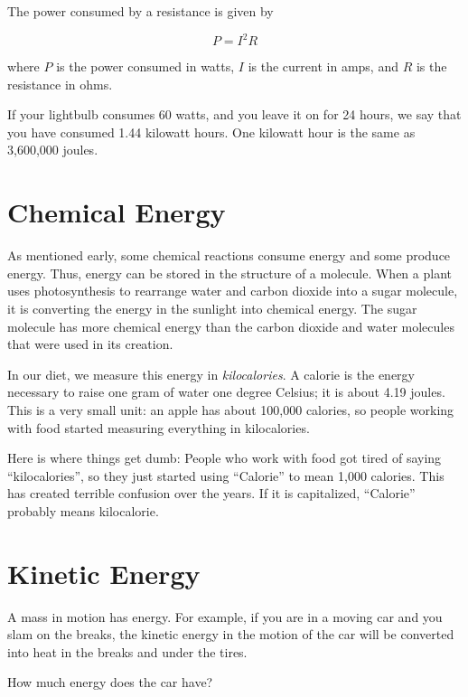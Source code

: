 \begin{mdframed}[style=important]
The power consumed by a resistance is given by

$$P = I^2R$$

where $P$ is the power consumed in watts, $I$ is the current in amps,
and $R$ is the resistance in ohms.

\end{mdframed}


If your lightbulb consumes 60 watts, and you leave it on for 24 hours,
we say that you have consumed 1.44 kilowatt hours. One kilowatt hour
is the same as 3,600,000 joules.

\section{Chemical Energy}

As mentioned early, some chemical reactions consume energy and some
produce energy. Thus, energy can be stored in the structure of a
molecule. When a plant uses photosynthesis to rearrange water and
carbon dioxide into a sugar molecule, it is converting the energy in
the sunlight into chemical energy. The sugar molecule has more
chemical energy than the carbon dioxide and water molecules that were
used in its creation.

In our diet, we measure this energy in \textit{kilocalories}. A
calorie is the energy necessary to raise one gram of water one degree
Celsius; it is about 4.19 joules. This is a very small unit: an apple
has about 100,000 calories, so people working with food started
measuring everything in kilocalories.

Here is where things get dumb: People who work with food got tired of
saying ``kilocalories'', so they just started using ``Calorie'' to
mean 1,000 calories.  This has created terrible confusion over the
years. If it is capitalized, ``Calorie'' probably means kilocalorie.

\section{Kinetic Energy}

A mass in motion has energy. For example, if you are in a moving car
and you slam on the breaks, the kinetic energy in the motion of the
car will be converted into heat in the breaks and under the tires.

How much energy does the car have?

